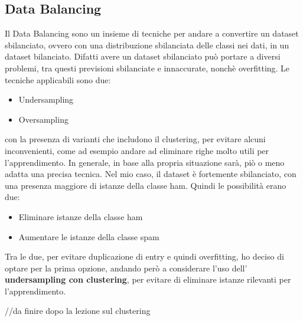\documentclass[]{article}
\begin{document}
        \subsection{Data Balancing}
            Il Data Balancing sono un insieme di tecniche per andare a convertire un dataset sbilanciato, ovvero con una distribuzione sbilanciata delle classi nei dati, in un dataset bilanciato. Difatti avere un dataset sbilanciato può portare a diversi problemi, tra questi previsioni sbilanciate e innaccurate, nonchè overfitting.
            Le tecniche applicabili sono due:
            \begin{itemize}
                \item Undersampling
                \item Oversampling
            \end{itemize}
            con la presenza di varianti che includono il clustering, per evitare alcuni inconvenienti, come ad esempio andare ad eliminare righe molto utili per l'apprendimento. In generale, in base alla propria situazione sarà, piò o meno adatta una precisa tecnica.
            Nel mio caso, il dataset è fortemente sbilanciato, con una presenza maggiore di istanze della classe ham. Quindi le possibilità erano due:
            \begin{itemize}
                \item Eliminare istanze della classe ham
                \item Aumentare le istanze della classe spam
            \end{itemize}
            Tra le due, per evitare duplicazione di entry e quindi overfitting, ho deciso di optare per la prima opzione, andando però a considerare l'uso dell' \textbf{undersampling con clustering}, per evitare di eliminare istanze rilevanti per l'apprendimento.

            //da finire dopo la lezione sul clustering
\end{document}
